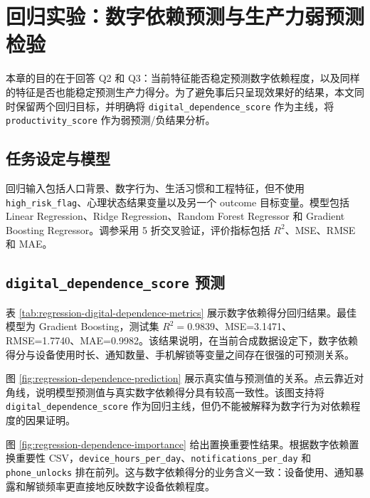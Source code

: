 \section{回归实验：数字依赖预测与生产力弱预测检验}

本章的目的在于回答 Q2 和 Q3：当前特征能否稳定预测数字依赖程度，以及同样的特征是否也能稳定预测生产力得分。为了避免事后只呈现效果好的结果，本文同时保留两个回归目标，并明确将 \texttt{digital\_dependence\_score} 作为主线，将 \texttt{productivity\_score} 作为弱预测/负结果分析。

\subsection{任务设定与模型}

回归输入包括人口背景、数字行为、生活习惯和工程特征，但不使用 \texttt{high\_risk\_flag}、心理状态结果变量以及另一个 outcome 目标变量。模型包括 Linear Regression、Ridge Regression、Random Forest Regressor 和 Gradient Boosting Regressor。调参采用 5 折交叉验证，评价指标包括 $R^2$、MSE、RMSE 和 MAE。

\subsection{\texttt{digital\_dependence\_score} 预测}

表 \ref{tab:regression-digital-dependence-metrics} 展示数字依赖得分回归结果。最佳模型为 Gradient Boosting，测试集 $R^2=0.9839$、MSE=3.1471、RMSE=1.7740、MAE=0.9982。该结果说明，在当前合成数据设定下，数字依赖得分与设备使用时长、通知数量、手机解锁等变量之间存在很强的可预测关系。



图 \ref{fig:regression-dependence-prediction} 展示真实值与预测值的关系。点云靠近对角线，说明模型预测值与真实数字依赖得分具有较高一致性。该图支持将 \texttt{digital\_dependence\_score} 作为回归主线，但仍不能被解释为数字行为对依赖程度的因果证明。


图 \ref{fig:regression-dependence-importance} 给出置换重要性结果。根据数字依赖置换重要性 CSV，\texttt{device\_hours\_per\_day}、\texttt{notifications\_per\_day} 和 \texttt{phone\_unlocks} 排在前列。这与数字依赖得分的业务含义一致：设备使用、通知暴露和解锁频率更直接地反映数字设备依赖程度。


